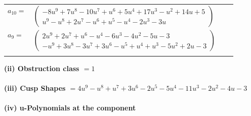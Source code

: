 \documentclass[1p]{elsarticle_modified}
\theoremstyle{definition}
\begin{document}
\begin{tabular}{m{7pt} m{180pt} m{7pt} m{180pt} }
\flushright $a_{10}=$&$\begin{pmatrix}-8 u^9+7 u^8-10 u^7+u^6+5 u^4+17 u^3- u^2+14 u+5\\u^9- u^8+2 u^7- u^6+u^5- u^4-2 u^3-3 u\end{pmatrix}$ \\
\flushright $a_{9}=$&$\begin{pmatrix}2 u^9+2 u^7+u^6- u^4-6 u^3-4 u^2-5 u-3\\- u^9+3 u^8-3 u^7+3 u^6- u^5+u^4+u^3-5 u^2+2 u-3\end{pmatrix}$\\&\end{tabular}
\flushleft \textbf{(ii) Obstruction class $= 1$}\\~\\
\flushleft \textbf{(iii) Cusp Shapes $= 4 u^9- u^8+u^7+3 u^6-2 u^5-5 u^4-11 u^3-2 u^2-4 u-3$}\\~\\
\newpage\renewcommand{\arraystretch}{1}
\flushleft \textbf{(iv) u-Polynomials at the component}\newline \\
\end{document}
